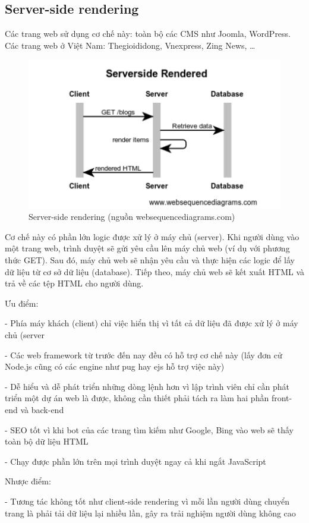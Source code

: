 \documentclass[12pt]{report}
\begin{document}
\subsection{Server-side rendering}
Các trang web sử dụng cơ chế này: toàn bộ các CMS như Joomla, WordPress. Các trang web ở Việt Nam: Thegioididong, Vnexpress, Zing News, …

\begin{figure}[h]
	\centering
	\includegraphics[scale=1.2]{Image/3.1.png}
	\caption{Server-side rendering (nguồn websequencediagrams.com) }
	\label{fig:image3.1}
\end{figure}

Cơ chế này có phần lớn logic được xử lý ở máy chủ (server). Khi người dùng vào một trang web, trình duyệt sẽ gửi yêu cầu lên máy chủ web (ví dụ với phương thức GET). Sau đó, máy chủ web sẽ nhận yêu cầu và thực hiện các logic để lấy dữ liệu từ cơ sở dữ liệu (database). Tiếp theo, máy chủ web sẽ kết xuất HTML và trả về các tệp HTML cho người dùng.

Ưu điểm:

- Phía máy khách (client) chỉ việc hiển thị vì tất cả dữ liệu đã được xử lý ở máy chủ (server

- Các web framework từ trước đến nay đều có hỗ trợ cơ chế này (lấy đơn cử Node.js cũng có các engine như pug hay ejs hỗ trợ việc này)

- Dễ hiểu và dễ phát triển những dòng lệnh hơn vì lập trình viên chỉ cần phát triển một dự án web là được, không cần thiết phải tách ra làm hai phần front-end và back-end

- SEO tốt vì khi bot của các trang tìm kiếm như Google, Bing vào web sẽ thấy toàn bộ dữ liệu HTML

- Chạy được phần lớn trên mọi trình duyệt ngay cả khi ngắt JavaScript

Nhược điểm:

- Tương tác không tốt như client-side rendering vì mỗi lần người dùng chuyển trang là phải tải dữ liệu lại nhiều lần, gây ra trải nghiệm người dùng không cao
\end{document}
